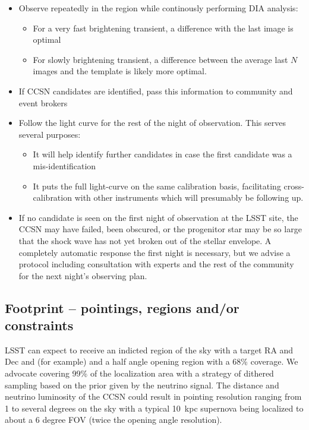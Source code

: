 \documentclass[11pt, letterpaper]{article}
\begin{document}
\begin{itemize}
\item Observe repeatedly in the region while continously performing DIA analysis:
\begin{itemize}
    \item For a very fast brightening transient, a difference with the last image is optimal
    \item For slowly brightening transient, a difference between the
      average last $N$ images and the template is likely more optimal.
\end{itemize}
\item If CCSN candidates are identified, pass this information to
  community and event brokers
\item Follow the light curve for the rest of the night of
  observation. This serves several purposes:
  \begin{itemize}
  \item It will help identify further candidates in case the first
    candidate was a mis-identification
  \item It puts the full light-curve on the same calibration basis,
    facilitating cross-calibration with other instruments which will
    presumably be following up.
  \end{itemize}
\item If no candidate is seen on the first night of observation at the
  LSST site, the CCSN may have failed, been obscured, or the
  progenitor star may be so large that the shock wave has not yet
  broken out of the stellar envelope.  A completely automatic response
  the first night is necessary, but we advise a protocol including
  consultation with experts and the rest of the community for the next
  night's observing plan.
\end{itemize}

\subsection{Footprint -- pointings, regions and/or constraints}

LSST can expect to receive an indicted region of the sky with a target
RA and Dec and (for example) and a half angle opening region with a
68\% coverage.  We advocate covering 99\% of the localization area
with a strategy of dithered sampling based on the prior given by the
neutrino signal.  The distance and neutrino luminosity of the CCSN
could result in pointing resolution ranging from 1 to several degrees
on the sky with a typical 10~kpc supernova being localized to about a
6 degree FOV (twice the opening angle resolution).
\end{document}
